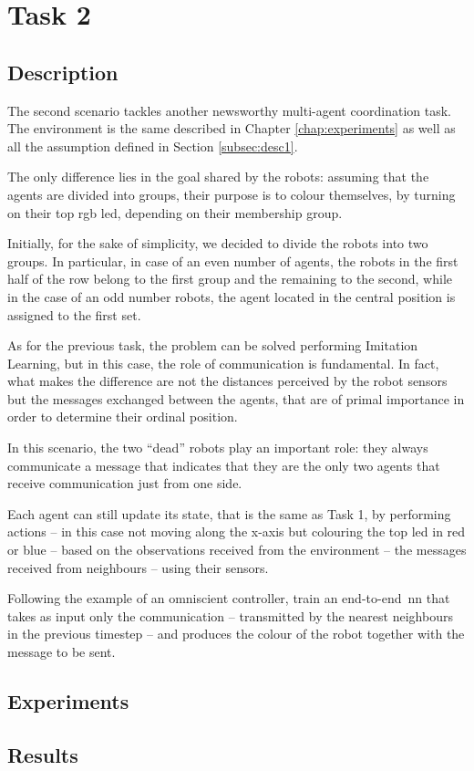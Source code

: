 \section{Task 2}
\label{sec:task2}

\subsection{Description}
\label{subsec:desc2}

The second scenario tackles another newsworthy multi-agent coordination task. 
The environment is the same described in Chapter \ref{chap:experiments} as 
well as all the assumption defined in Section \ref{subsec:desc1}.

The only difference lies in the goal shared by the robots: assuming that the agents 
are divided into groups, their purpose is to colour themselves, by turning on their 
top \gls{rgb} \gls{led}, depending on their membership group.

Initially, for the sake of simplicity, we decided to divide the robots into two 
groups. In particular, in case of an even number of agents, the robots in the first 
half of the row belong to the first group and the remaining to the second, while in 
the case of an odd number robots, the agent located in the central position is 
assigned to the first set.

As for the previous task, the problem can be solved performing Imitation 
Learning, but in this case, the role of communication is fundamental. In fact, what 
makes the difference are not the distances perceived by the robot sensors but the 
messages exchanged between the agents, that are of primal importance in order 
to determine their ordinal position. 

In this scenario, the two ``dead'' robots play an important role: they always 
communicate a message that indicates that they are the only two agents that 
receive communication just from one side.

Each agent can still update its state, that is the same as Task 1, by performing 
actions – in this case not moving along the x-axis but colouring the top \gls{led} 
in red or blue – based on the observations received from the environment – the 
messages received from neighbours – using their sensors. 

Following the example of an omniscient controller, train an end-to-end \gls{nn} 
that takes as input only the communication – transmitted by the nearest 
neighbours in the previous timestep – and produces the colour of the robot 
together with the message to be sent.

\subsection{Experiments}
\label{subsec:ex2}

\subsection{Results}
\label{subsec:results2}
